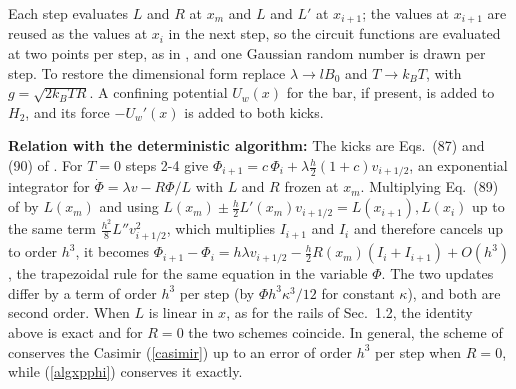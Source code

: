 \documentclass[11pt]{article}
\begin{document}
Each step evaluates $L$ and $R$ at $x_m$ and $L$ and $L'$ at $x_{i+1}$; the values at $x_{i+1}$ are reused as the values at $x_i$ in the next step, so the circuit functions are evaluated at two points per step, as in \cite{alvarez}, and one Gaussian random number is drawn per step. To restore the dimensional form replace $\lambda\to lB_0$ and $T\to k_BT$, with $g=\sqrt{2k_BTR}$. A confining potential $U_w(x)$ for the bar, if present, is added to $H_2$, and its force $-U_w'(x)$ is added to both kicks.

{\bf Relation with the deterministic algorithm:} The kicks are Eqs.~(87) and (90) of \cite{alvarez}. For $T=0$ steps 2-4 give $\Phi_{i+1}=c\,\Phi_i+\lambda\frac{h}{2}(1+c)v_{i+1/2}$, an exponential integrator for $\dot{\Phi}=\lambda v-R\Phi/L$ with $L$ and $R$ frozen at $x_m$. Multiplying Eq.~(89) of \cite{alvarez} by $L(x_m)$ and using $L(x_m)\pm\frac{h}{2}L'(x_m)v_{i+1/2}=L(x_{i+1}),L(x_i)$ up to the same term $\frac{h^2}{8}L''v_{i+1/2}^2$, which multiplies $I_{i+1}$ and $I_i$ and therefore cancels up to order $h^3$, it becomes $\Phi_{i+1}-\Phi_i=h\lambda v_{i+1/2}-\frac{h}{2}R(x_m)(I_i+I_{i+1})+O(h^3)$, the trapezoidal rule for the same equation in the variable $\Phi$. The two updates differ by a term of order $h^3$ per step (by $\Phi h^3\kappa^3/12$ for constant $\kappa$), and both are second order. When $L$ is linear in $x$, as for the rails of Sec.~1.2, the identity above is exact and for $R=0$ the two schemes coincide. In general, the scheme of \cite{alvarez} conserves the Casimir (\ref{casimir}) up to an error of order $h^3$ per step when $R=0$, while (\ref{algxpphi}) conserves it exactly.
\end{document}
